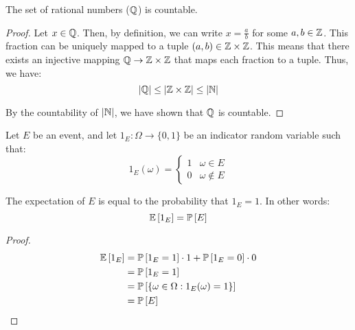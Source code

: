 \documentclass[name=Jacob\ Strieb, andrewid=jstrieb, course=69-420, num=8]{homework}
\begin{document}
    

\begin{claim}
    The set of rational numbers ($\mathbb{Q}$) is countable.
\end{claim}
\begin{proof}
    Let $x \in \mathbb{Q}$. Then, by definition, we can write $x = \frac{a}{b}$ for some $a, b \in \mathbb{Z}$. This fraction can be uniquely mapped to a tuple $(a, b) \in \mathbb{Z} \times \mathbb{Z}$. This means that there exists an injective mapping $\mathbb{Q} \to \mathbb{Z} \times \mathbb{Z}$ that maps each fraction to a tuple. Thus, we have:
    $$ |\mathbb{Q}| \leq |\mathbb{Z} \times \mathbb{Z}| \leq |\mathbb{N}| $$
    
    By the countability of $|\mathbb{N}|$, we have shown that $\mathbb{Q}$ is countable.
\end{proof}
\newpage

Let $E$ be an event, and let $1_E : \Omega \to \{ 0, 1 \}$ be an indicator random variable such that:
$$ 1_E(\omega) = \begin{cases}
1 & \omega \in E \\
0 & \omega \notin E
\end{cases} $$

\begin{claim}
    The expectation of $E$ is equal to the probability that $1_E = 1$. In other words:
    $$ \mathbb{E}\left[ 1_E \right] = \mathbb{P}\left[ E \right] $$
\end{claim}
\begin{proof}
    \begin{align*}
    \mathbb{E}\left[ 1_E \right] &= \mathbb{P}\left[ 1_E = 1 \right] \cdot 1 + \mathbb{P}\left[ 1_E = 0 \right] \cdot 0 \\
    &= \mathbb{P}\left[ 1_E = 1 \right] \\
    &= \mathbb{P}\left[  \{ \omega \in \Omega : 1_E(\omega) = 1 \}  \right] \\
    &= \mathbb{P}\left[ E \right]
    \end{align*}
\end{proof}
\newpage

\end{document}
